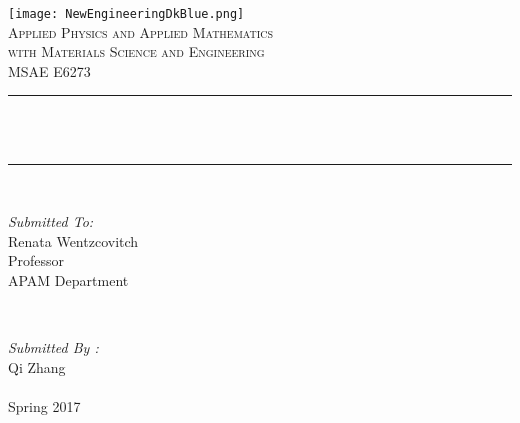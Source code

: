 \begin{titlepage}
	\centering
	\vspace*{0.5 cm}
	\texttt{[image: NewEngineeringDkBlue.png]}\\[1.0 cm]	%
	\textsc{\Large Applied Physics and Applied Mathematics\\
		\large with Materials Science and Engineering}\\[2.0 cm]	%
	\textsc{\Large MSAE E6273}\\[0.5 cm]				%
	\rule{\linewidth}{0.2 mm} \\[0.4 cm]
	{ \huge \bfseries \thetitle}\\
	\rule{\linewidth}{0.2 mm} \\[1.5 cm]

	\begin{minipage}{0.4\textwidth}
		\begin{flushleft} \large
			\emph{Submitted To:}\\
			Renata Wentzcovitch\\
			Professor\\
			APAM Department\\
		\end{flushleft}
	\end{minipage}~
	\begin{minipage}{0.4\textwidth}

		\begin{flushright} \large
			\emph{Submitted By :} \\
			Qi Zhang\\
			\\
			Spring 2017\\
		\end{flushright}

	\end{minipage}\\[2 cm]
\end{titlepage}

